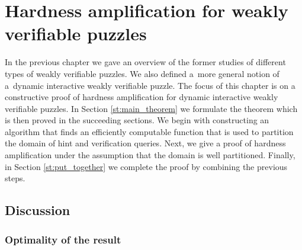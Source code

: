 \documentclass[11pt,a4paper,titlepage]{memoir}
\begin{document}
\chapter{Hardness amplification for weakly verifiable puzzles}
\label{ch:main_result}
In the previous chapter we gave an overview of the former studies of different types of weakly verifiable puzzles.
We also defined a~more general notion of a~dynamic interactive weakly verifiable puzzle.
The focus of this chapter is on a constructive proof of hardness amplification for dynamic interactive weakly verifiable puzzles.
In Section \ref{st:main_theorem} we formulate the theorem which is then proved in the succeeding sections.
We begin with constructing an algorithm that finds an efficiently computable function that is used
to partition the domain of hint and verification queries. Next, we give a proof of hardness amplification
under the assumption that the domain is well partitioned. Finally, in Section \ref{st:put_together}
we complete the proof by combining the previous steps.
%

%

%

%

%
\section{Discussion}
\subsection{Optimality of the result}
%
%
\appendix


\backmatter



\end{document}
